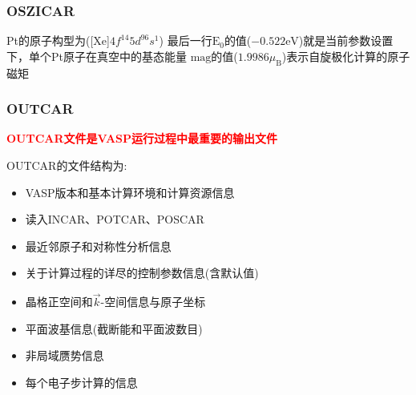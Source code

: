 \frame
{
	\frametitle{\textrm{OSZICAR}}
\textrm{Pt}的原子构型为([\textrm{Xe}]$4\mathit{f}^{14}5\mathit{d}^96\mathit{s}^1$)
\vskip 5pt
最后一行$\mathrm{E}_0$的值($-0.522\mathrm{eV}$)就是当前参数设置下，单个\textrm{Pt}原子在真空中的基态能量
{\fontsize{8.5pt}{5.2pt}}	
$\mathrm{mag}$的值($1.9986\mu_{\mathrm{B}}$)表示自旋极化计算的原子磁矩%
{\fontsize{8.5pt}{5.2pt}}
}
\frame
{
	\frametitle{\textrm{OUTCAR}}
	\textcolor{red}{
\textbf{OUTCAR文件是\textrm{VASP}运行过程中最重要的输出文件}%
}

{\fontsize{7.5pt}{5.2pt}\selectfont{文件不仅包括输入文件的既有信息，还有计算体系的对称性分析，$\vec k$空间布点和具体位置，平面波基信息和最近邻原子的距离等基本信息;~此外记录了每一步离子弛豫和电子弛豫的计算信息}}%

\textrm{OUTCAR}的文件结构为:~
\begin{itemize}
	\item \textrm{VASP}版本和基本计算环境和计算资源信息
	\item 读入\textrm{INCAR}、\textrm{POTCAR}、\textrm{POSCAR}
	\item 最近邻原子和对称性分析信息
	\item 关于计算过程的详尽的控制参数信息(含默认值)
	\item 晶格正空间和$\vec k$-空间信息与原子坐标
	\item 平面波基信息(截断能和平面波数目)
	\item 非局域赝势信息
	\item 每个电子步计算的信息
	\end{itemize}
}

